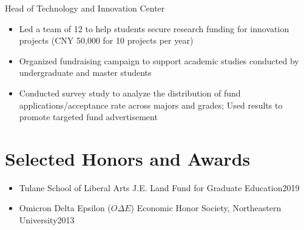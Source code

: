 \documentclass{resume}
\begin{document}

Head of Technology and Innovation Center
\begin{itemize}
  \item Led a team of 12 to help students secure research funding for innovation projects (CNY 50,000 for 10 projects per year)
  \item Organized fundraising campaign to support academic studies conducted by undergraduate and master students
  \item Conducted survey study to analyze the distribution of fund applications/acceptance rate across majors and grades; Used results to promote targeted fund advertisement
\end{itemize}


\section{Selected Honors and Awards}
\begin{itemize}[parsep=0.25ex]
  \item Tulane School of Liberal Arts J.E. Land Fund for Graduate Education\hfill 2019
  \item Omicron Delta Epsilon ($O\Delta E$) Economic Honor Society, Northeastern University\hfill 2013
\end{itemize}
\end{document}
